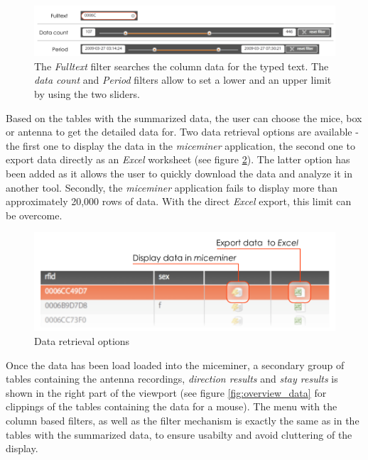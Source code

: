 \begin{figure}[htpb]
\begin{center}
  \includegraphics[width=\textwidth]{assets/pdf/filter_types.pdf}
  \caption[Filter types]{The \textit{Fulltext} filter searches the column data for the typed text. The \textit{data count} and \textit{Period} filters allow to set a lower and an upper limit by using the two sliders.}
  \label{fig:filter_types}
\end{center}
\end{figure}

Based on the tables with the summarized data, the user can choose the mice, box or antenna to get the detailed data for. Two data retrieval options are available - the first one to display the data in the \textit{miceminer} application, the second one to export data directly as an \textit{Excel} worksheet (see figure \ref{fig:get_data_options}). The latter option has been added as it allows the user to quickly download the data and analyze it in another tool. Secondly, the \textit{miceminer} application fails to display more than approximately 20,000 rows of data. With the direct \textit{Excel} export, this limit can be overcome.   

\begin{figure}[htpb]
\begin{center}
  \includegraphics[width=.75\textwidth]{assets/pdf/get_data_options.pdf}
  \caption{Data retrieval options}
  \label{fig:get_data_options}
\end{center}
\end{figure}

Once the data has been load loaded into the miceminer, a secondary group of tables containing the antenna recordings, \textit{direction results} and \textit{stay results} is shown in the right part of the viewport (see figure \ref{fig:overview_data} for clippings of the tables containing the data for a mouse). The menu with the column based filters, as well as the filter mechanism is exactly the same as in the tables with the summarized data, to ensure usabilty and avoid cluttering of the display. 

